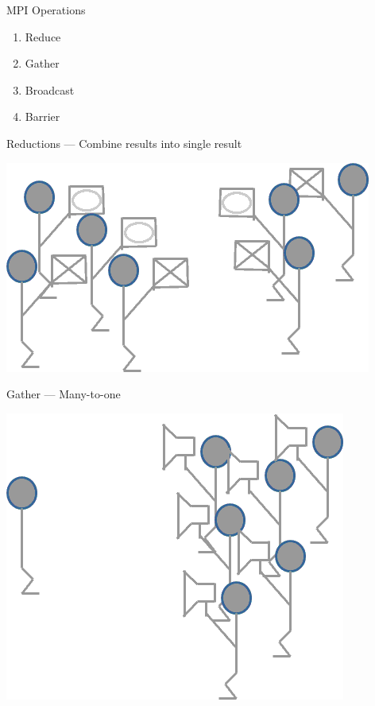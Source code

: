 \begin{frame}
  \begin{block}{MPI Operations}
    \begin{enumerate}
      \item Reduce
      \item Gather
      \item Broadcast
      \item Barrier
    \end{enumerate}
  \end{block}
\end{frame}

\begin{frame}
  \begin{block}{Reductions --- Combine results into single result}
    \begin{center}
      \includegraphics[scale=.6]{../common/pics/mpiops/mpi_reduce}
    \end{center}
  \end{block}
\end{frame}


\begin{frame}
  \begin{block}{Gather --- Many-to-one}
    \begin{center}
      \includegraphics[scale=.6]{../common/pics/mpiops/mpi_gather}
    \end{center}
  \end{block}
\end{frame}


